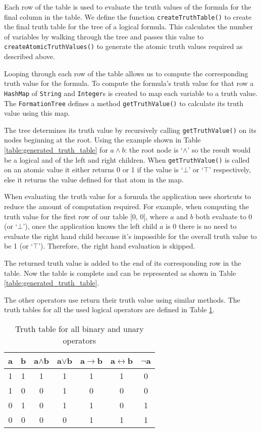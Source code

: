 \documentclass[draft]{report}
\begin{document}
Each row of the table is used to evaluate the truth values of the formula for the final column in the table. We define the function {\tt createTruthTable()} to create the final truth table for the tree of a logical formula. This calculates the number of variables by walking through the tree and passes this value to {\tt createAtomicTruthValues()} to generate the atomic truth values required as described above. 

Looping through each row of the table allows us to compute the corresponding truth value for the formula. To compute the formula's truth value for that row a {\tt HashMap} of {\tt String} and {\tt Integer}s is created to map each variable to a truth value. The {\tt FormationTree} defines a method {\tt getTruthValue()} to calculate its truth value using this map.

The tree determines its truth value by recursively calling {\tt getTruthValue()} on its nodes beginning at the root. Using the example shown in Table \ref{table:generated_truth_table} for $a \land b$: the root node is `$\land$' so the result would be a logical and of the left and right children. When {\tt getTruthValue()} is called on an atomic value it either returns 0 or 1 if the value is `$\bot$' or `$\top$' respectively, else it returns the value defined for that atom in the map.

When evaluating the truth value for a formula the application uses shortcuts to reduce the amount of computation required. For example, when computing the truth value for the first row of our table [0, 0], where $a$ and $b$ both evaluate to 0 (or `$\bot$'), once the application knows the left child $a$ is 0 there is no need to evaluate the right hand child because it's impossible for the overall truth value to be 1 (or `$\top$'). Therefore, the right hand evaluation is skipped.

The returned truth value is added to the end of its corresponding row in the table. Now the table is complete and can be represented as shown in Table \ref{table:generated_truth_table}.

The other operators use return their truth value using similar methods. The truth tables for all the used logical operators are defined in Table \ref{table:logical_operators}.

\begin{table}[h]
  \begin{center}
    \begin{tabular}{ | c | c || c | c | c | c | c | }
      \hline
      a & b & a$\land$b & a$\lor$b & a$\to$b & a$\leftrightarrow$b & $\lnot$a \\ \hline
      1 & 1 & 1 & 1 & 1 & 1 & 0 \\
      1 & 0 & 0 & 1 & 0 & 0 & 0 \\
      0 & 1 & 0 & 1 & 1 & 0 & 1 \\
      0 & 0 & 0 & 0 & 1 & 1 & 1 \\
      \hline
    \end{tabular}
  \end{center}
  \caption{Truth table for all binary and unary operators}
  \label{table:logical_operators}
\end{table}
\end{document}
